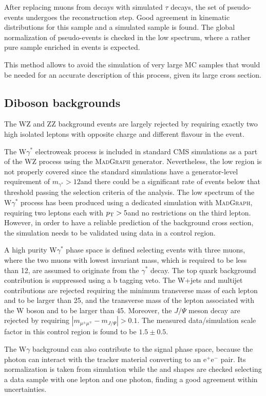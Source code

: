 After replacing muons from \dymm decays with simulated $\tau$ decays, the set of pseudo-\dytt events undergoes the reconstruction step. Good agreement in kinematic distributions for this sample
and a simulated \dytt sample is found. The global normalization of pseudo-\dytt events is checked in the low \mt spectrum, where a rather pure sample enriched in \dytt events is expected.

This method allows to avoid the simulation of very large MC samples that would be needed for an accurate description of this process, given its large cross section. 





\subsection{Diboson backgrounds\label{sec:diboson}}

The WZ and ZZ background events are largely rejected by requiring exactly two high \pt isolated leptons with opposite charge and different flavour in the event. 

The W$\gamma^*$ electroweak process is included in standard CMS simulations as a part of the WZ
process using the \textsc{MadGraph} generator. Nevertheless, the low \mll region is not properly covered since the standard simulations have a generator-level requirement of $m_{\gamma^*}>12$\GeV and there could be a significant rate of events below that threshold passing the selection criteria of the analysis. The low \mll spectrum of the W$\gamma^*$ process has been produced using a dedicated simulation with \textsc{MadGraph}, requiring two leptons each with $p_\mathrm{T} > 5$\GeV and no restrictions on the third lepton. However, in order to have a reliable prediction of the background cross section, the simulation needs to be validated using data in a control region.

A high purity W$\gamma^*$ phase space is defined selecting events with three muons, where the two muons with lowest invariant mass, which is required to be less than 12\GeV, are assumed to originate from the $\gamma^*$ decay. The top quark background contribution is suppressed using a b tagging veto. The W+jets and multijet contributions are rejected requiring the minimum transverse mass of each lepton and \MET to be larger than 25\GeV, and the transverse mass of the lepton associated with the W boson and \MET to be larger than 45\GeV. Moreover, the $J/\Psi$ meson decay are rejected by requiring $|m_{\mu^{\pm}\mu^{\mp}} - m_{J/\Psi}|>0.1$\GeV.
The measured data/simulation scale factor in this control region is found to be $1.5 \pm 0.5$.

The W$\gamma$ background can also contribute to the signal phase space, because the photon can interact with the tracker material converting to an $\mathrm{e^+e^-}$ pair. Its normalization is taken from simulation while the \mll and \mt shapes are checked selecting a data sample with one lepton and one photon, finding a good agreement within uncertainties.

